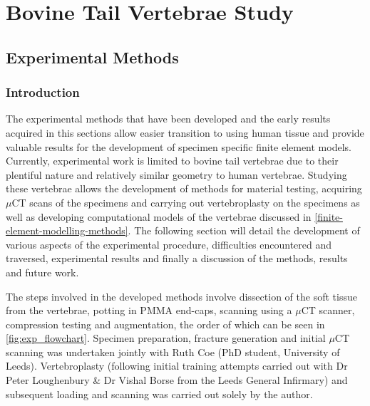 \chapter{Bovine Tail Vertebrae Study}\label{chap_bov}

\section{Experimental Methods}\label{experimental-methods}

\subsection{Introduction}

The experimental methods that have been developed and the early results
acquired in this sections allow easier transition to using human tissue  and
provide valuable results for the development of specimen specific finite
element models. Currently, experimental work is limited to bovine tail
vertebrae due to their plentiful nature and relatively similar geometry to
human vertebrae. Studying these vertebrae allows the development of methods for
material testing, acquiring $\mu$CT scans of the specimens and carrying out
vertebroplasty on the specimens as well as developing computational models of
the vertebrae discussed in \cref{finite-element-modelling-methods}. The
following section will detail the development of various aspects of the
experimental procedure, difficulties encountered and traversed, experimental
results and finally a discussion of the methods, results and future work.

The steps involved in the developed methods involve dissection of the soft
tissue from the vertebrae, potting in PMMA end-caps, scanning using a $\mu$CT
scanner, compression testing and augmentation, the order of which can be seen
in \cref{fig:exp_flowchart}.  Specimen preparation, fracture generation and
initial $\mu$CT scanning was undertaken jointly with Ruth Coe (PhD student,
University of Leeds). Vertebroplasty (following initial training attempts
carried out with Dr Peter Loughenbury \& Dr Vishal Borse from the Leeds General
Infirmary) and subsequent loading and scanning was carried out solely by the
author.

